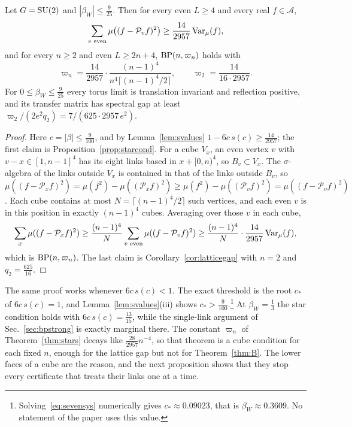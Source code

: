 \begin{theorem}\label{thm:stars}
Let $G=\mathrm{SU}(2)$ and $|\beta_W|\le\frac9{25}$. Then for every even $L\ge4$ and
every real $f\in\mathcal A$,
\[
\sum_{v\text{ even}}\mu\bigl((f-\mathcal P_vf)^2\bigr)\ge\frac{14}{2957}
\operatorname{Var}_\mu(f),
\]
and for every $n\ge2$ and even $L\ge2n+4$, $\mathrm{BP}(n,\varpi_n)$ holds with
\[
\varpi_n=\frac{14}{2957}\cdot\frac{(n-1)^4}{n^4\lceil(n-1)^4/2\rceil},\qquad
\varpi_2=\frac{14}{16\cdot2957}.
\]
For $0\le\beta_W\le\frac9{25}$ every torus limit is translation invariant and
reflection positive, and its transfer matrix has spectral gap at least
$\varpi_2/(2e^2q_2)=7/(625\cdot2957\,e^2)$.
\end{theorem}

\begin{proof}
Here $c=|\beta|\le\frac9{100}$, and by Lemma~\ref{lem:svalues}
$1-6c\,s(c)\ge\frac{14}{2957}$; the first claim is
Proposition~\ref{prop:starcond}. For a cube $V_x$, an even vertex $v$ with
$v-x\in[1,n-1]^4$ has its eight links based in $x+[0,n)^4$, so $B_v\subset
V_x$. The $\sigma$-algebra of the links outside $V_x$ is contained in that of
the links outside $B_v$, so $\mu((f-\mathcal P_xf)^2)=\mu(f^2)-\mu((\mathcal
P_xf)^2)\ge\mu(f^2)-\mu((\mathcal P_vf)^2)=\mu((f-\mathcal P_vf)^2)$. Each cube
contains at most $N=\lceil(n-1)^4/2\rceil$ such vertices, and each even $v$ is
in this position in exactly $(n-1)^4$ cubes. Averaging over those $v$ in each
cube,
\[
\sum_x\mu((f-\mathcal P_xf)^2)\ge\frac{(n-1)^4}{N}\sum_{v\text{ even}}
\mu((f-\mathcal P_vf)^2)\ge\frac{(n-1)^4}N\cdot\frac{14}{2957}\operatorname{Var}_\mu(f),
\]
which is $\mathrm{BP}(n,\varpi_n)$. The last claim is Corollary~\ref{cor:latticegap}
with $n=2$ and $q_2=\frac{625}{16}$.
\end{proof}

The same proof works whenever $6c\,s(c)<1$. The exact threshold is the root
$c_*$ of $6c\,s(c)=1$, and Lemma~\ref{lem:svalues}(iii) shows
$c_*>\frac9{100}$.\footnote{Solving~\eqref{eq:sevensys} numerically gives
$c_*\approx0.09023$, that is $\beta_W\approx0.3609$. No statement of the paper
uses this value.} At $\beta_W=\frac13$ the star condition holds with
$6c\,s(c)=\frac{13}{15}$, while the single-link argument of
Sec.~\ref{sec:bpstrong} is exactly marginal there. The constant $\varpi_n$ of
Theorem~\ref{thm:stars} decays like $\frac{28}{2957}n^{-4}$, so that theorem is
a cube condition for each fixed $n$, enough for the lattice gap but not for
Theorem~\ref{thm:B}. The lower faces of a cube are the reason, and the next
proposition shows that they stop every certificate that treats their links
one at a time.

